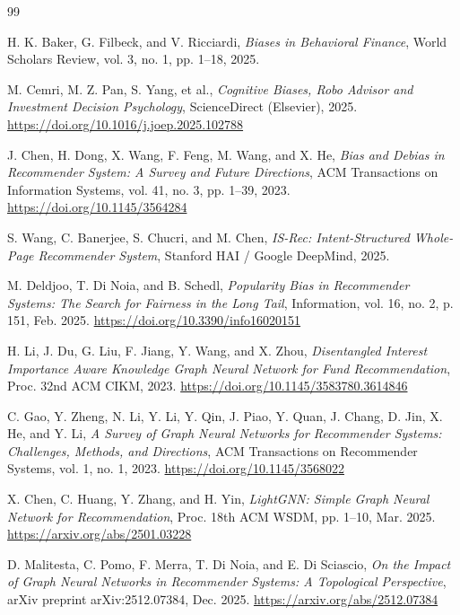 \documentclass[12pt, a4paper]{article}
\begin{document}
\begin{thebibliography}{99}

H. K. Baker, G. Filbeck, and V. Ricciardi,
\textit{Biases in Behavioral Finance},
World Scholars Review, vol. 3, no. 1, pp. 1--18, 2025.

M. Cemri, M. Z. Pan, S. Yang, et al.,
\textit{Cognitive Biases, Robo Advisor and Investment Decision Psychology},
ScienceDirect (Elsevier), 2025.
\url{https://doi.org/10.1016/j.joep.2025.102788}

J. Chen, H. Dong, X. Wang, F. Feng, M. Wang, and X. He,
\textit{Bias and Debias in Recommender System: A Survey and Future Directions},
ACM Transactions on Information Systems, vol. 41, no. 3, pp. 1--39, 2023.
\url{https://doi.org/10.1145/3564284}

S. Wang, C. Banerjee, S. Chucri, and M. Chen,
\textit{IS-Rec: Intent-Structured Whole-Page Recommender System},
Stanford HAI / Google DeepMind, 2025.

M. Deldjoo, T. Di Noia, and B. Schedl,
\textit{Popularity Bias in Recommender Systems: The Search for Fairness in the Long Tail},
Information, vol. 16, no. 2, p. 151, Feb. 2025.
\url{https://doi.org/10.3390/info16020151}

H. Li, J. Du, G. Liu, F. Jiang, Y. Wang, and X. Zhou,
\textit{Disentangled Interest Importance Aware Knowledge Graph Neural Network for
Fund Recommendation},
Proc. 32nd ACM CIKM, 2023.
\url{https://doi.org/10.1145/3583780.3614846}

C. Gao, Y. Zheng, N. Li, Y. Li, Y. Qin, J. Piao, Y. Quan, J. Chang, D. Jin,
X. He, and Y. Li,
\textit{A Survey of Graph Neural Networks for Recommender Systems: Challenges,
Methods, and Directions},
ACM Transactions on Recommender Systems, vol. 1, no. 1, 2023.
\url{https://doi.org/10.1145/3568022}

X. Chen, C. Huang, Y. Zhang, and H. Yin,
\textit{LightGNN: Simple Graph Neural Network for Recommendation},
Proc. 18th ACM WSDM, pp. 1--10, Mar. 2025.
\url{https://arxiv.org/abs/2501.03228}

D. Malitesta, C. Pomo, F. Merra, T. Di Noia, and E. Di Sciascio,
\textit{On the Impact of Graph Neural Networks in Recommender Systems:
A Topological Perspective},
arXiv preprint arXiv:2512.07384, Dec. 2025.
\url{https://arxiv.org/abs/2512.07384}


\end{thebibliography}
\end{document}
